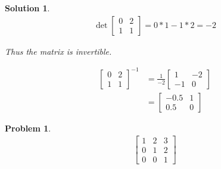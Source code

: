\documentclass{article}
\newtheorem{problem}{Problem}
\newtheorem*{solution}{Solution}
\begin{document}
\begin{solution}

\begin{align*}
\det \begin{bmatrix}0 & 2 \\ 1 & 1\end{bmatrix} = 0*1 - 1*2 = -2
\end{align*}

Thus the matrix is invertible.

\begin{align*}
\begin{bmatrix}0 & 2 \\ 1 & 1\end{bmatrix}^{-1} &= \displaystyle\frac{1}{-2} \begin{bmatrix}1 & -2 \\ -1 & 0\end{bmatrix} \\
&= \begin{bmatrix} -0.5 & 1 \\ 0.5 & 0\end{bmatrix}
\end{align*}
\end{solution}

\begin{problem}
\begin{align*}
\begin{bmatrix}
1 & 2 & 3 \\ 0 & 1 & 2 \\ 0 & 0 & 1
\end{bmatrix}
\end{align*}
\end{problem}
\end{document}
